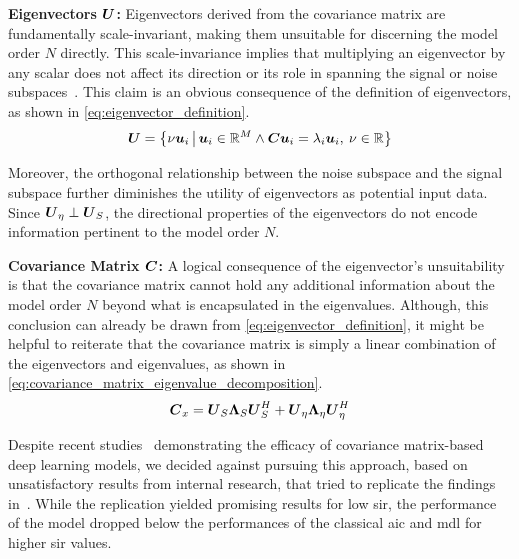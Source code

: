 \textbf{Eigenvectors \( \boldsymbol{U} \):}
Eigenvectors derived from the covariance matrix are fundamentally scale-invariant,
making them unsuitable for discerning the model order \(N\) directly. This scale-invariance implies that multiplying an
eigenvector by any scalar does not affect its direction or its role in spanning the signal or noise subspaces~\cite{axler.ch5}.
This claim is an obvious consequence of the definition of eigenvectors, as shown in \autoref{eq:eigenvector_definition}.
\begin{equation}
    \boldsymbol{U} = \left\{ \nu \boldsymbol{u}_i \,\middle|\, \boldsymbol{u}_i \in \mathbb{R}^M \land \boldsymbol{C}\boldsymbol{u}_i = \lambda_i\boldsymbol{u}_i,\: \nu \in \mathbb{R} \right\}
    \label{eq:eigenvector_definition}
\end{equation}

Moreover, the orthogonal relationship between the noise subspace and the signal subspace further diminishes the utility of eigenvectors as potential input data.
Since \( \boldsymbol{U}_\eta \perp \boldsymbol{U}_S \), the directional properties of the eigenvectors do not encode information
pertinent to the model order \(N\).

\textbf{Covariance Matrix \( \boldsymbol{C} \):}
A logical consequence of the eigenvector's unsuitability is that the covariance matrix cannot hold any additional information
about the model order \( N \) beyond what is encapsulated in the eigenvalues. Although, this conclusion can already be drawn
from \autoref{eq:eigenvector_definition}, it might be helpful to reiterate that the covariance matrix is simply a linear
combination of the eigenvectors and eigenvalues, as shown in \autoref{eq:covariance_matrix_eigenvalue_decomposition}.
\begin{equation}
    \boldsymbol{C}_x = \boldsymbol{U}_S \boldsymbol{\Lambda}_S \boldsymbol{U}_S^H + \boldsymbol{U}_{\eta} \boldsymbol{\Lambda}_{\eta} \boldsymbol{U}_{\eta}^H
    \label{eq:covariance_matrix_eigenvalue_decomposition}
\end{equation}

Despite recent studies~\cite{barthelme21sub, yu22RCNN, barthelme2020} demonstrating the efficacy of covariance matrix-based deep learning models,
we decided against pursuing this approach, based on unsatisfactory results from internal research, that tried to replicate the
findings in~\cite{barthelme2020}.
While the replication yielded promising results for low \gls{sir}, the performance of the model dropped below the performances
of the classical \gls{aic} and \gls{mdl} for higher \gls{sir} values. \\

